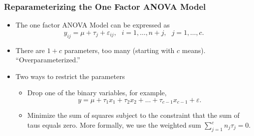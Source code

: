     \begin{frame}%
 \frametitle{Reparameterizing the One Factor ANOVA Model}
   \begin{itemize}
    \item The one factor ANOVA Model can be expressed as
\begin{equation*}
y_{ij}=\mu +\tau_{j} + \varepsilon_{ij}, ~~~i=1, \ldots, n+j,
~~~j=1,\ldots, c.
\end{equation*}
\item There are $1+c$ parameters, too many (starting with $c$
means). ``Overparameterized.''
\item Two ways to restrict the parameters
   \begin{itemize}
    \item Drop one of the binary variables, for example,
    \begin{equation*}
y=\mu +\tau _{1}x_{1}+\tau _{2}x_{2}+\ldots +\tau
_{c-1}x_{c-1}+\varepsilon.
\end{equation*}
\item Minimize the sum of squares subject to the constraint that the
sum of taus equals zero. More formally, we use the weighted sum
$\sum_{j=1}^{c}n_{j}\tau _{j}=0 $.
      \end{itemize}
         \end{itemize}

    \end{frame}


